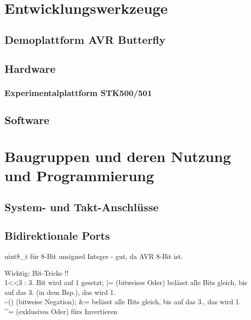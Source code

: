 {\section{Entwicklungswerkzeuge}
\subsection{Demoplattform AVR Butterfly}
\subsection{Hardware}
\subsubsection{Experimentalplattform STK500/501}
\subsection{Software}

\section{Baugruppen und deren Nutzung und Programmierung}
\subsection{System- und Takt-Anschlüsse}
\subsection{Bidirektionale Ports}
uint8\_t für 8-Bit unsigned Integer - gut, da AVR 8-Bit ist.
}
Wichtig: Bit-Tricks !!\\
1<<3 : 3. Bit wird auf 1 gesetzt; |= (bitweises Oder) belässt alle Bits gleich, bis auf das 3. (in dem Bsp.), das wird 1.\\
\textasciitilde() (bitweise Negation); \&= belässt alle Bits gleich, bis auf das 3., das wird 1.\\
\^{}= (exklusives Oder) fürs Invertieren

